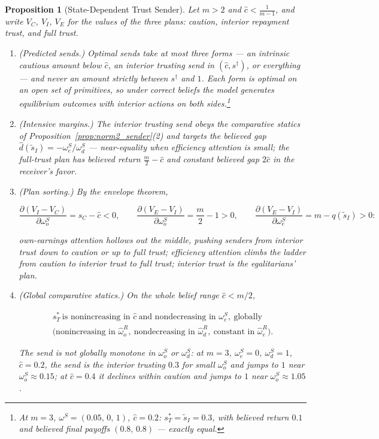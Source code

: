\documentclass[11pt]{article}
\theoremstyle{plain}
\newtheorem{proposition}{Proposition}
\theoremstyle{remark}
\begin{document}
\begin{proposition}[State-Dependent Trust Sender]
\label{prop:norm3_sender}
Let $m>2$ and $\hat c<\frac1{m-1}$, and write $V_C$, $V_I$, $V_E$ for the values of the three plans: caution, interior repayment trust, and full trust.
\begin{enumerate}[topsep=2pt,itemsep=2pt]
\item \emph{(Predicted sends.)}  Optimal sends take at most three forms --- an intrinsic cautious amount below $\hat c$, an interior trusting send in $(\hat c,s^\dagger)$, or everything --- and never an amount strictly between $s^\dagger$ and $1$.  Each form is optimal on an open set of primitives, so under correct beliefs the model generates equilibrium outcomes with interior actions on both sides.\footnote{At $m=3$, $\omega^S=(0.05,\,0,\,1)$, $\hat c=0.2$: $s_T^\ast=\tilde s_I=0.3$, with believed return $0.1$ and believed final payoffs $(0.8,\,0.8)$ --- exactly equal.}
\item \emph{(Intensive margins.)}  The interior trusting send obeys the comparative statics of Proposition~\ref{prop:norm2_sender}(2) and targets the believed gap $\hat d(\tilde s_I)=-\omega_e^S/\omega_d^S$ --- near-equality when efficiency attention is small; the full-trust plan has believed return $\frac m2-\hat c$ and constant believed gap $2\hat c$ in the receiver's favor.
\item \emph{(Plan sorting.)}  By the envelope theorem,
\begin{csbox}
\[
        \frac{\partial(V_I-V_C)}{\partial\omega_o^S}=s_C-\hat c<0,
        \qquad
        \frac{\partial(V_E-V_I)}{\partial\omega_o^S}=\frac m2-1>0,
        \qquad
        \frac{\partial(V_E-V_I)}{\partial\omega_e^S}=m-q(\tilde s_I)>0 :
\]
\end{csbox}
own-earnings attention \emph{hollows out the middle}, pushing senders from interior trust down to caution or up to full trust; efficiency attention climbs the ladder from caution to interior trust to full trust; interior trust is the egalitarians' plan.
\item \emph{(Global comparative statics.)}  On the whole belief range $\hat c<m/2$,
\begin{csbox}
\begin{gather*}
        s_T^\ast\ \text{is nonincreasing in }\hat c\ \text{and nondecreasing in }\omega_e^S,\ \text{globally}\\
        \big(\text{nonincreasing in }\hat\omega_o^{R},\ \text{nondecreasing in }\hat\omega_d^{R},\ \text{constant in }\hat\omega_e^{R}\big).
\end{gather*}
\end{csbox}
The send is not globally monotone in $\omega_o^S$ or $\omega_d^S$: at $m=3$, $\omega_e^S=0$, $\omega_d^S=1$, $\hat c=0.2$, the send is the interior trusting $0.3$ for small $\omega_o^S$ and jumps to $1$ near $\omega_o^S\approx0.15$; at $\hat c=0.4$ it declines within caution and jumps to $1$ near $\omega_o^S\approx1.05$.
\end{enumerate}
\end{proposition}
\end{document}
